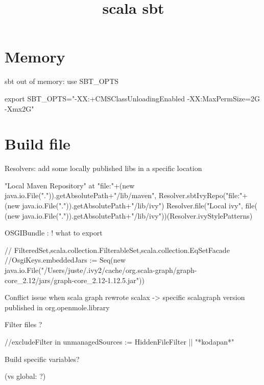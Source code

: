 


\title{scala sbt}


\date{}


\maketitle

\justify

\renewcommand{\abstractname}{}

\begin{abstract}

\end{abstract}


\section*{Memory}

sbt out of memory: use SBT_OPTS

export SBT_OPTS="-XX:+CMSClassUnloadingEnabled -XX:MaxPermSize=2G -Xmx2G"




\section*{Build file}


Resolvers: add some locally published libs in a specific location

"Local Maven Repository" at "file:"+(new java.io.File(".")).getAbsolutePath+"/lib/maven",
 Resolver.sbtIvyRepo("file:"+(new java.io.File(".")).getAbsolutePath+"/lib/ivy")
 Resolver.file("Local ivy", file( (new java.io.File(".")).getAbsolutePath+"/lib/ivy"))(Resolver.ivyStylePatterns)


OSGIBundle : ! what to export

  // FilteredSet,scala.collection.FilterableSet,scala.collection.EqSetFacade
  //OsgiKeys.embeddedJars := Seq(new java.io.File("/Users/juste/.ivy2/cache/org.scala-graph/graph-core_2.12/jars/graph-core_2.12-1.12.5.jar"))

Conflict issue when scala graph rewrote scalax -> specific scalagraph version published in org.openmole.library



Filter files ?

//excludeFilter in unmanagedSources := HiddenFileFilter || "*kodapan*"


Build specific variables? 

(vs global: ?)


